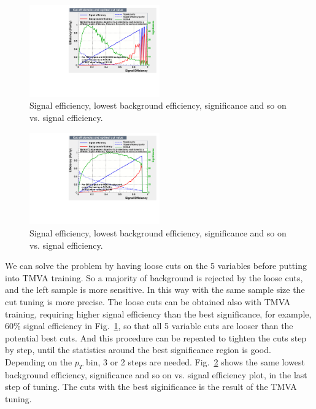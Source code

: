 \documentclass[a4paper]{article}
\begin{document}
\begin{figure}[htbp]
\centering
\includegraphics[keepaspectratio,width=0.5\textwidth,angle=0]{fig/effPass1.pdf}
\caption{Signal efficiency, lowest background efficiency, significance and so on vs. signal efficiency.}
\label{fig:effPass1}
\end{figure}

\begin{figure}[htbp]
\centering
\includegraphics[keepaspectratio,width=0.5\textwidth,angle=0]{fig/effPass4.pdf}
\caption{Signal efficiency, lowest background efficiency, significance and so on vs. signal efficiency.}
\label{fig:effPass4}
\end{figure}

We can solve the problem by having loose cuts on the 5 variables before putting into TMVA training. So a majority of background is rejected by the loose cuts, and the left sample is more sensitive. In this way with the same sample size the cut tuning is more precise. The loose cuts can be obtained also with TMVA training, requiring higher signal efficiency than the best significance, for example, 60\% signal efficiency in Fig.~\ref{fig:effPass1}, so that all 5 variable cuts are looser than the potential best cuts. And this procedure can be repeated to tighten the cuts step by step, until the statistics around the best significance region is good. Depending on the $p_T$ bin, 3 or 2 steps are needed. Fig.~\ref{fig:effPass4} shows the same lowest background efficiency, significance and so on vs. signal efficiency plot, in the last step of tuning. The cuts with the best siginificance is the result of the TMVA tuning.
\end{document}
